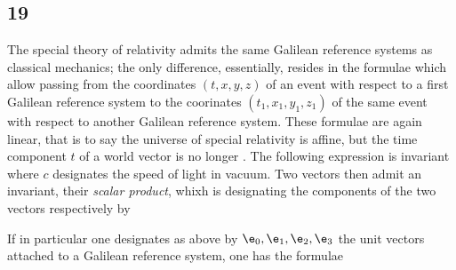 \subsection*{19}
The special theory of relativity admits the same Galilean reference systems as classical mechanics; the only difference, essentially, resides in the formulae which allow passing from the coordinates $(t,x,y,z)$ of an event with respect to a first Galilean reference system to the coorinates $(t_1,x_1,y_1,z_1)$ of the same event with respect to another Galilean reference system. These formulae are again linear, that is to say the universe of special relativity is affine, but the time component $t$ of a world vector is no longer . The following expression is invariant
where $c$ designates the speed of light in vacuum. Two vectors then admit an invariant, their \textit{scalar product}, whixh is
designating the components of the two vectors respectively by

If in particular one designates as above by $\e_0, \e_1, \e_2, \e_3$ the unit vectors attached to a Galilean reference system, one has the formulae
